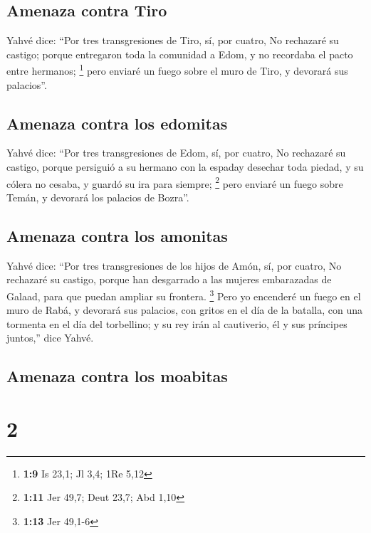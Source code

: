 \hypertarget{amenaza-contra-tiro}{%
\subsection{Amenaza contra Tiro}\label{amenaza-contra-tiro}}

 Yahvé dice: ``Por tres transgresiones de Tiro, sí, por
cuatro, No rechazaré su castigo; porque entregaron toda la comunidad a
Edom, y no recordaba el pacto entre hermanos; \footnote{\textbf{1:9} Is
  23,1; Jl 3,4; 1Re 5,12}  pero enviaré un fuego sobre el
muro de Tiro, y devorará sus palacios''.

\hypertarget{amenaza-contra-los-edomitas}{%
\subsection{Amenaza contra los
edomitas}\label{amenaza-contra-los-edomitas}}

 Yahvé dice: ``Por tres transgresiones de Edom, sí, por
cuatro, No rechazaré su castigo, porque persiguió a su hermano con la
espaday desechar toda piedad, y su cólera no cesaba, y guardó su ira
para siempre; \footnote{\textbf{1:11} Jer 49,7; Deut 23,7; Abd 1,10}
 pero enviaré un fuego sobre Temán, y devorará los
palacios de Bozra''.

\hypertarget{amenaza-contra-los-amonitas}{%
\subsection{Amenaza contra los
amonitas}\label{amenaza-contra-los-amonitas}}

 Yahvé dice: ``Por tres transgresiones de los hijos de
Amón, sí, por cuatro, No rechazaré su castigo, porque han desgarrado a
las mujeres embarazadas de Galaad, para que puedan ampliar su frontera.
\footnote{\textbf{1:13} Jer 49,1-6}  Pero yo encenderé un
fuego en el muro de Rabá, y devorará sus palacios, con gritos en el día
de la batalla, con una tormenta en el día del torbellino;
 y su rey irán al cautiverio, él y sus príncipes
juntos,'' dice Yahvé.

\hypertarget{amenaza-contra-los-moabitas}{%
\subsection{Amenaza contra los
moabitas}\label{amenaza-contra-los-moabitas}}

\hypertarget{section-1}{%
\section{2}\label{section-1}}

